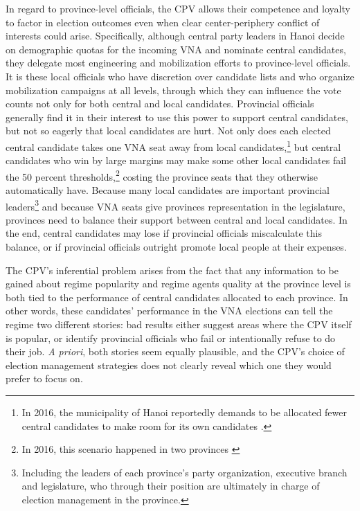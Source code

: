 \documentclass[12pt]{article}
\newcommand{\1}{\mathbbm{1}}
\begin{document}
In regard to province-level officials, the CPV allows their competence and loyalty to factor in election outcomes even when clear center-periphery conflict of interests could arise. Specifically, although central party leaders in Hanoi decide on demographic quotas for the incoming VNA and nominate central candidates, they delegate most engineering and mobilization efforts to province-level officials. It is these local officials who have discretion over candidate lists and who organize mobilization campaigns at all levels, through which they can influence the vote counts not only for both central and local candidates. Provincial officials generally find it in their interest to use this power to support central candidates, but not so eagerly that local candidates are hurt. Not only does each elected central candidate takes one VNA seat away from local candidates,\footnote{In 2016, the municipality of Hanoi reportedly demands to be allocated fewer central candidates to make room for its own candidates \citep{vnexpress2016_2}.} but central candidates who win by large margins may make some other local candidates fail the 50 percent thresholds,\footnote{In 2016, this scenario happened in two provinces \citep{vnexpress2016}} costing the province seats that they otherwise automatically have. Because many local candidates are important provincial leaders\footnote{Including the leaders of each province's party organization, executive branch and legislature, who through their position are ultimately in charge of election management in the province.} and because VNA seats give provinces representation in the legislature, provinces need to balance their support between central and local candidates. In the end, central candidates may lose if provincial officials miscalculate this balance, or if provincial officials outright promote local people at their expenses.

The CPV's inferential problem arises from the fact that any information to be gained about regime popularity and regime agents quality at the province level is both tied to the performance of central candidates allocated to each province. In other words, these candidates' performance in the VNA elections can tell the regime two different stories: bad results either suggest areas where the CPV itself is popular, or identify provincial officials who fail or intentionally refuse to do their job. \textit{A priori}, both stories seem equally plausible, and the CPV's choice of election management strategies does not clearly reveal which one they would prefer to focus on.
\end{document}
